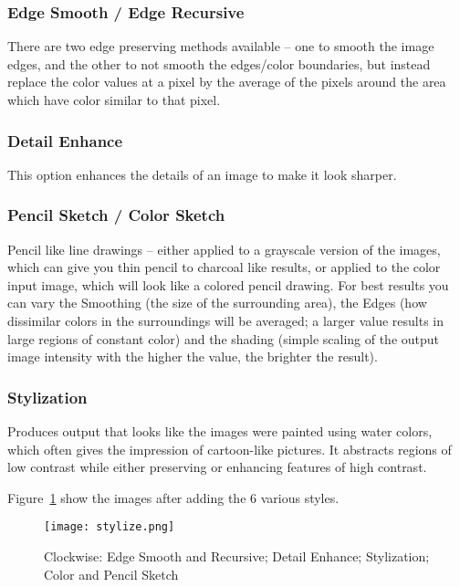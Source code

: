 \subsubsection*{Edge Smooth / Edge Recursive}%
\label{ssub:edge_smooth_recursive}

There are two edge preserving methods available -- one to smooth the image edges, and the other to not smooth the edges/color boundaries, but instead replace the color values at a pixel by the average of the pixels around the area which have color similar to that pixel.

\subsubsection*{Detail Enhance}%
\label{ssub:detail_enhance}

This option enhances the details of an image to make it look sharper.

\subsubsection*{Pencil Sketch / Color Sketch}%
\label{ssub:pencil_color_sketch}

Pencil like line drawings -- either applied to a grayscale version of the images, which can give you thin pencil to charcoal like results, or applied to the color input image, which will look like a colored pencil drawing. For best results you can vary the Smoothing (the size of the surrounding area), the Edges (how dissimilar colors in the surroundings will be averaged; a larger value results in large regions of constant color) and the shading (simple scaling of the output image intensity with the higher the value, the brighter the result).

\subsubsection*{Stylization}%
\label{ssub:stylization}

Produces output that looks like the images were painted using water colors, which often gives the impression of cartoon-like pictures. It abstracts regions of low contrast while either preserving or enhancing features of high contrast.

Figure~\ref{fig:stylize} show the images after adding the 6 various styles.

\begin{figure}[htpb]
    \centering
    \texttt{[image: stylize.png]}
    \caption{Clockwise: Edge Smooth and Recursive; Detail Enhance; Stylization; Color and Pencil Sketch}
    \label{fig:stylize}
\end{figure}

